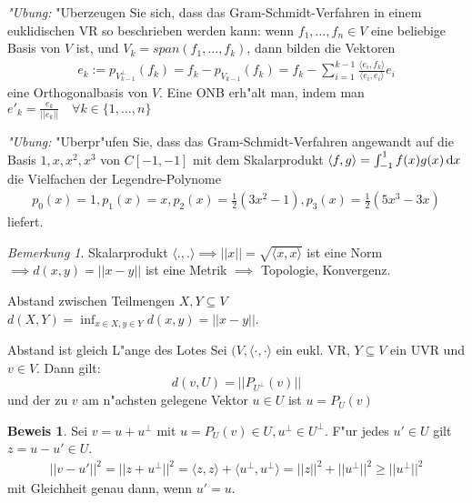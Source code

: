 \documentclass[oneside,fontsize=11pt,paper=a4,BCOR=0mm,DIV=12,automark,headsepline]{scrbook}
\theoremstyle{remark}
\theoremstyle{definition}
\theoremstyle{definition}
\newtheorem*{prof}{Beweis}
\theoremstyle{remark}
\newtheorem*{bem}{Bemerkung}
\begin{document}
\emph{"Ubung:} "Uberzeugen Sie sich, dass das Gram-Schmidt-Verfahren in einem euklidischen VR so beschrieben werden kann: wenn \(f_1, \dots, f_n \in V\) eine beliebige Basis von \(V\) ist, und \(V_k = span(f_1, \dots, f_k)\), dann bilden die Vektoren \begin{align*}e_k := p_{V_{k-1}^\perp}(f_k) = f_k - p_{V_{k-1}}(f_k) = f_k - \sum_{i=1}^{k-1}\frac{\langle e_i, f_k\rangle}{\langle e_i, e_i\rangle}e_i\end{align*} eine Orthogonalbasis von \(V\). Eine ONB erh"alt man, indem man \(e'_k = \frac{e_k}{||e_k||} \quad\forall k\in \{1,\dots,n\}\)

\emph{"Ubung:} "Uberpr"ufen Sie, dass das Gram-Schmidt-Verfahren angewandt auf die Basis \(1, x, x^2, x^3\) von \(C[-1, -1]\) mit dem Skalarprodukt \(\langle f, g\rangle = \int_{-1}^1f(x)g(x)\dif x\) die Vielfachen der Legendre-Polynome
\begin{align*}
  p_0(x) = 1, p_1(x) = x, p_2(x) = \frac{1}{2}(3x^2 - 1), p_3(x) = \frac{1}{2}(5x^3 - 3x)
\end{align*}
liefert.

\begin{bem}
  Skalarprodukt \(\langle . , .\rangle \implies ||x|| = \sqrt{\langle x, x\rangle}\) ist eine Norm \(\implies d(x, y) = ||x-y||\) ist eine Metrik \(\implies\) Topologie, Konvergenz.
\end{bem}

\begin{definition}{Abstand zwischen Teilmengen $X,Y \subseteq V$}{}
  $d(X,Y)= \inf_{x\in X, y\in Y} d(x,y)=||x-y||$.
\end{definition}

\begin{satz}{Abstand ist gleich L"ange des Lotes}
  Sei $(V, \langle {\cdot, \cdot} \rangle$ ein eukl. VR, $Y\subseteq V$ ein UVR
  und $v\in V$. Dann gilt: \[d(v, U) = ||P_{U^\perp}(v)||\] und der zu $v$ am
  n"achsten gelegene Vektor $u\in U$ ist $u=P_U(v)$
\end{satz}



\begin{prof}
  Sei \(v = u + u^\perp\) mit \(u = P_U(v) \in U, u^\perp \in U^\perp\). F"ur jedes \(u' \in U\) gilt \(z = u - u' \in U\).
  \begin{align*}
    ||v - u'||^2 = ||z + u^\perp||^2 = \langle z, z\rangle + \langle u^\perp , u^\perp\rangle = ||z||^2 + ||u^\perp||^2 \geq ||u^\perp||^2
  \end{align*}
  mit Gleichheit genau dann, wenn \(u' = u\).
\end{prof}
\end{document}
